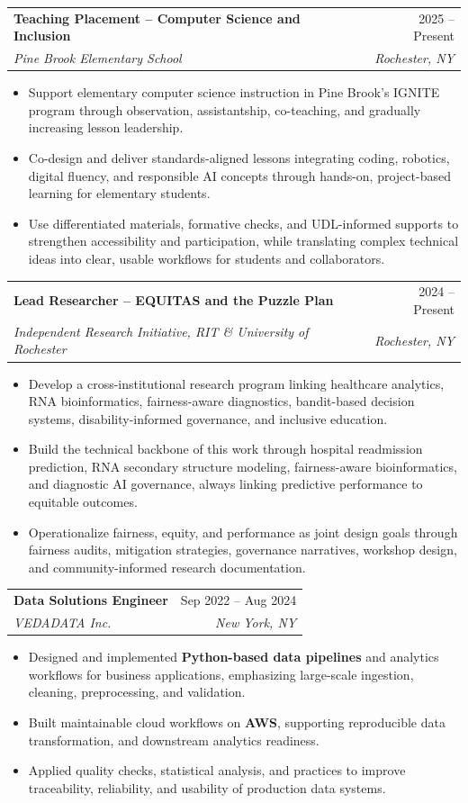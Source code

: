 \documentclass[10pt]{article}
\makeatletter
\newcommand{\resumeItem}[1]{\item\small{#1}}
\newcommand{\resumeSubheading}[4]{
  \vspace{4pt}
  \noindent
  \begin{tabular*}{\textwidth}[t]{@{}l@{\extracolsep{\fill}}r@{}}
    \textbf{#1} & #2 \\
    \textit{\small #3} & \textit{\small #4} \\
  \end{tabular*}\vspace{-4pt}
}
\makeatother
\begin{document}
\resumeSubheading
{Teaching Placement -- Computer Science and Inclusion}{2025 -- Present}
{Pine Brook Elementary School}{Rochester, NY}
\begin{itemize}[leftmargin=1.2em]
\resumeItem{Support elementary computer science instruction in Pine Brook's IGNITE program through observation, assistantship, co-teaching, and gradually increasing lesson leadership.}
\resumeItem{Co-design and deliver standards-aligned lessons integrating coding, robotics, digital fluency, and responsible AI concepts through hands-on, project-based learning for elementary students.}
\resumeItem{Use differentiated materials, formative checks, and UDL-informed supports to strengthen accessibility and participation, while translating complex technical ideas into clear, usable workflows for students and collaborators.}
\end{itemize}

\resumeSubheading
{Lead Researcher -- EQUITAS and the Puzzle Plan}{2024 -- Present}
{Independent Research Initiative, RIT \& University of Rochester}{Rochester, NY}
\begin{itemize}[leftmargin=1.2em]
\resumeItem{Develop a cross-institutional research program linking healthcare analytics, RNA bioinformatics, fairness-aware diagnostics, bandit-based decision systems, disability-informed governance, and inclusive education.}
\resumeItem{Build the technical backbone of this work through hospital readmission prediction, RNA secondary structure modeling, fairness-aware bioinformatics, and diagnostic AI governance, always linking predictive performance to equitable outcomes.}
\resumeItem{Operationalize fairness, equity, and performance as joint design goals through fairness audits, mitigation strategies, governance narratives, workshop design, and community-informed research documentation.}
\end{itemize}

\resumeSubheading
{Data Solutions Engineer}{Sep 2022 -- Aug 2024}
{VEDADATA Inc.}{New York, NY}
\begin{itemize}[leftmargin=1.2em]
\resumeItem{Designed and implemented \textbf{Python-based data pipelines} and analytics workflows for business applications, emphasizing large-scale ingestion, cleaning, preprocessing, and validation.}
\resumeItem{Built maintainable cloud workflows on \textbf{AWS}, supporting reproducible data transformation, and downstream analytics readiness.}
\resumeItem{Applied quality checks, statistical analysis, and practices to improve traceability, reliability, and usability of production data systems.}
\end{itemize}
\end{document}
